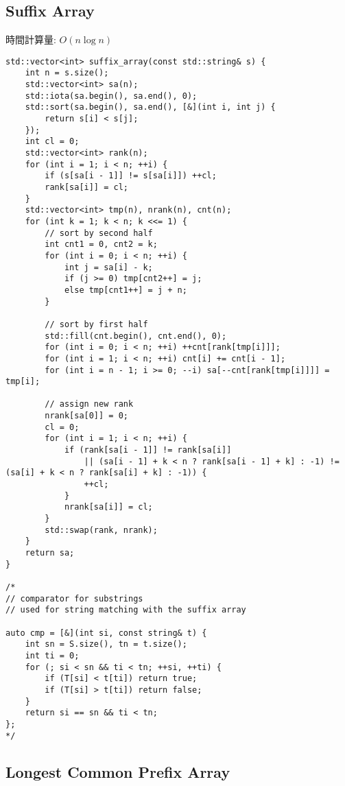 \subsection{Suffix Array}

\begin{small}
時間計算量: $O(n\log n)$
\end{small}

\begin{lstlisting}
std::vector<int> suffix_array(const std::string& s) {
    int n = s.size();
    std::vector<int> sa(n);
    std::iota(sa.begin(), sa.end(), 0);
    std::sort(sa.begin(), sa.end(), [&](int i, int j) {
        return s[i] < s[j];
    });
    int cl = 0;
    std::vector<int> rank(n);
    for (int i = 1; i < n; ++i) {
        if (s[sa[i - 1]] != s[sa[i]]) ++cl;
        rank[sa[i]] = cl;
    }
    std::vector<int> tmp(n), nrank(n), cnt(n);
    for (int k = 1; k < n; k <<= 1) {
        // sort by second half
        int cnt1 = 0, cnt2 = k;
        for (int i = 0; i < n; ++i) {
            int j = sa[i] - k;
            if (j >= 0) tmp[cnt2++] = j;
            else tmp[cnt1++] = j + n;
        }

        // sort by first half
        std::fill(cnt.begin(), cnt.end(), 0);
        for (int i = 0; i < n; ++i) ++cnt[rank[tmp[i]]];
        for (int i = 1; i < n; ++i) cnt[i] += cnt[i - 1];
        for (int i = n - 1; i >= 0; --i) sa[--cnt[rank[tmp[i]]]] = tmp[i];

        // assign new rank
        nrank[sa[0]] = 0;
        cl = 0;
        for (int i = 1; i < n; ++i) {
            if (rank[sa[i - 1]] != rank[sa[i]]
                || (sa[i - 1] + k < n ? rank[sa[i - 1] + k] : -1) != (sa[i] + k < n ? rank[sa[i] + k] : -1)) {
                ++cl;
            }
            nrank[sa[i]] = cl;
        }
        std::swap(rank, nrank);
    }
    return sa;
}

/*
// comparator for substrings
// used for string matching with the suffix array

auto cmp = [&](int si, const string& t) {
    int sn = S.size(), tn = t.size();
    int ti = 0;
    for (; si < sn && ti < tn; ++si, ++ti) {
        if (T[si] < t[ti]) return true;
        if (T[si] > t[ti]) return false;
    }
    return si == sn && ti < tn;
};
*/
\end{lstlisting}

\subsection{Longest Common Prefix Array}

